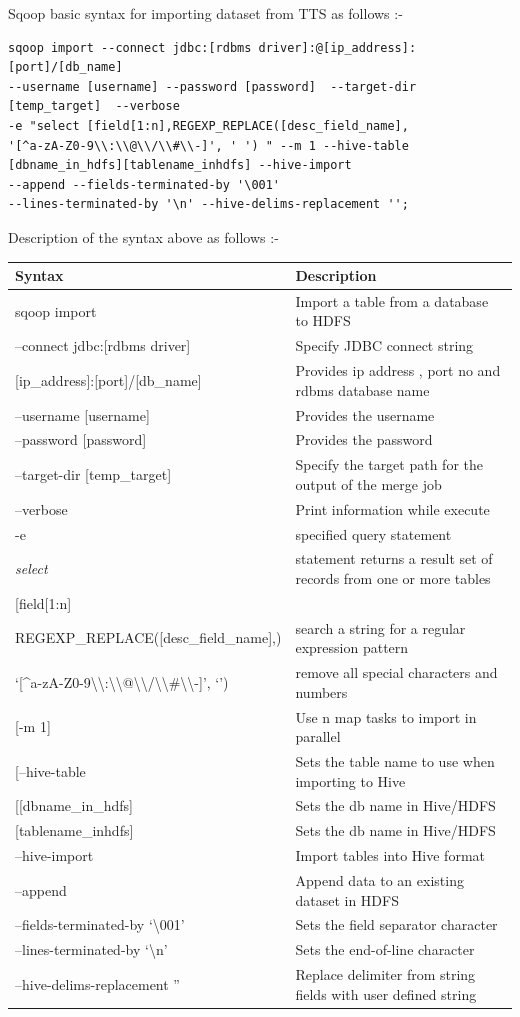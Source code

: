\documentclass[]{article}
\begin{document}
\newpage

Sqoop basic syntax for importing dataset from TTS as follows :-

\begin{verbatim}
sqoop import --connect jdbc:[rdbms driver]:@[ip_address]:[port]/[db_name] 
--username [username] --password [password]  --target-dir [temp_target]  --verbose 
-e "select [field[1:n],REGEXP_REPLACE([desc_field_name],
'[^a-zA-Z0-9\\:\\@\\/\\#\\-]', ' ') " --m 1 --hive-table 
[dbname_in_hdfs][tablename_inhdfs] --hive-import
--append --fields-terminated-by '\001'  
--lines-terminated-by '\n' --hive-delims-replacement '';
\end{verbatim}

Description of the syntax above as follows :-

\begin{longtable}[c]{@{}ll@{}}
\toprule
Syntax & Description\tabularnewline
\midrule
\endhead
sqoop import & Import a table from a database to HDFS\tabularnewline
--connect jdbc:{[}rdbms driver{]} & Specify JDBC connect
string\tabularnewline
{[}ip\_address{]}:{[}port{]}/{[}db\_name{]} & Provides ip address , port
no and rdbms database name\tabularnewline
--username {[}username{]} & Provides the username\tabularnewline
--password {[}password{]} & Provides the password\tabularnewline
--target-dir {[}temp\_target{]} & Specify the target path for the output
of the merge job\tabularnewline
--verbose & Print information while execute\tabularnewline
-e & specified query statement\tabularnewline
\emph{select} & statement returns a result set of records from one or
more tables\tabularnewline
{[}field{[}1:n{]} &\tabularnewline
REGEXP\_REPLACE({[}desc\_field\_name{]},) & search a string for a
regular expression pattern\tabularnewline
`{[}\^{}a-zA-Z0-9\textbackslash{}\textbackslash{}:\textbackslash{}\textbackslash{}@\textbackslash{}\textbackslash{}/\textbackslash{}\textbackslash{}\#\textbackslash{}\textbackslash{}-{]}',
`') & remove all special characters and numbers\tabularnewline
{[}-m 1{]} & Use n map tasks to import in parallel\tabularnewline
{[}--hive-table & Sets the table name to use when importing to
Hive\tabularnewline
{[}{[}dbname\_in\_hdfs{]} & Sets the db name in Hive/HDFS\tabularnewline
{[}tablename\_inhdfs{]} & Sets the db name in Hive/HDFS\tabularnewline
--hive-import & Import tables into Hive format\tabularnewline
--append & Append data to an existing dataset in HDFS\tabularnewline
--fields-terminated-by `\textbackslash{}001' & Sets the field separator
character\tabularnewline
--lines-terminated-by `\textbackslash{}n' & Sets the end-of-line
character\tabularnewline
--hive-delims-replacement '' & Replace delimiter from string fields with
user defined string\tabularnewline
\bottomrule
\end{longtable}
\end{document}
